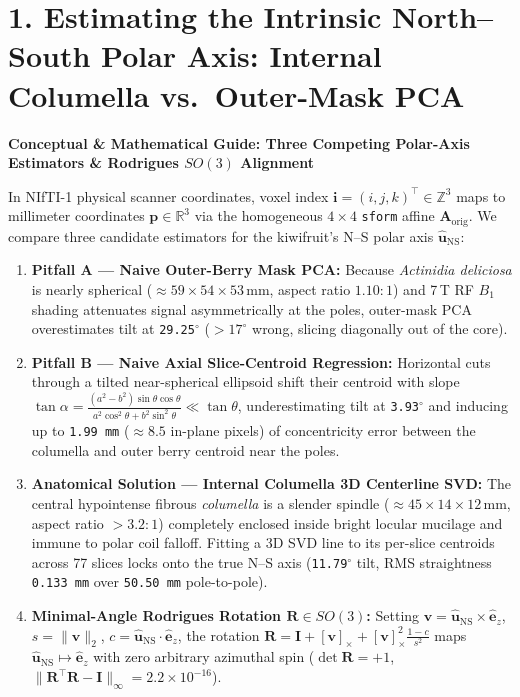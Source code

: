 \documentclass[10pt,a4paper]{article}
\renewcommand{\_}{\origunderscore\allowbreak}
\begin{document}
\section*{1. Estimating the Intrinsic North--South Polar Axis: Internal Columella vs.\ Outer-Mask PCA}

\begin{guidehdr}
{\small\bfseries\color{kiwigreen!75!black}Conceptual \& Mathematical Guide: Three Competing Polar-Axis Estimators \& Rodrigues $SO(3)$ Alignment}
\end{guidehdr}
In NIfTI-1 physical scanner coordinates, voxel index $\mathbf{i} = (i, j, k)^\top \in \mathbb{Z}^3$ maps to millimeter coordinates $\mathbf{p} \in \mathbb{R}^3$ via the homogeneous $4 \times 4$ \texttt{sform} affine $\mathbf{A}_{\text{orig}}$. We compare three candidate estimators for the kiwifruit's N--S polar axis $\hat{\mathbf{u}}_{\text{NS}}$:
\begin{enumerate}
    \item \textbf{Pitfall A --- Naive Outer-Berry Mask PCA:} Because \textit{Actinidia deliciosa} is nearly spherical ($\approx 59 \times 54 \times 53\,\text{mm}$, aspect ratio $1.10:1$) and 7\,T RF $B_1$ shading attenuates signal asymmetrically at the poles, outer-mask PCA overestimates tilt at \texttt{29.25$^\circ$} ($>17^\circ$ wrong, slicing diagonally out of the core).
    \item \textbf{Pitfall B --- Naive Axial Slice-Centroid Regression:} Horizontal cuts through a tilted near-spherical ellipsoid shift their centroid with slope $\tan\alpha = \frac{(a^2 - b^2)\sin\theta\cos\theta}{a^2\cos^2\theta + b^2\sin^2\theta} \ll \tan\theta$, underestimating tilt at \texttt{3.93$^\circ$} and inducing up to \texttt{1.99\,mm} ($\approx 8.5$ in-plane pixels) of concentricity error between the columella and outer berry centroid near the poles.
    \item \textbf{Anatomical Solution --- Internal Columella 3D Centerline SVD:} The central hypointense fibrous \textit{columella} is a slender spindle ($\approx 45 \times 14 \times 12\,\text{mm}$, aspect ratio $>3.2:1$) completely enclosed inside bright locular mucilage and immune to polar coil falloff. Fitting a 3D SVD line to its per-slice centroids across 77 slices locks onto the true N--S axis (\texttt{11.79$^\circ$} tilt, RMS straightness \texttt{0.133\,mm} over \texttt{50.50\,mm} pole-to-pole).
    \item \textbf{Minimal-Angle Rodrigues Rotation $\mathbf{R} \in SO(3)$:} Setting $\mathbf{v} = \hat{\mathbf{u}}_{\text{NS}} \times \hat{\mathbf{e}}_z$, $s = \|\mathbf{v}\|_2$, $c = \hat{\mathbf{u}}_{\text{NS}} \cdot \hat{\mathbf{e}}_z$, the rotation $\mathbf{R} = \mathbf{I} + [\mathbf{v}]_\times + [\mathbf{v}]_\times^2 \frac{1-c}{s^2}$ maps $\hat{\mathbf{u}}_{\text{NS}} \mapsto \hat{\mathbf{e}}_z$ with zero arbitrary azimuthal spin ($\det\mathbf{R} = +1$, $\|\mathbf{R}^\top\mathbf{R} - \mathbf{I}\|_\infty = 2.2\times 10^{-16}$).
\end{enumerate}
\end{document}

